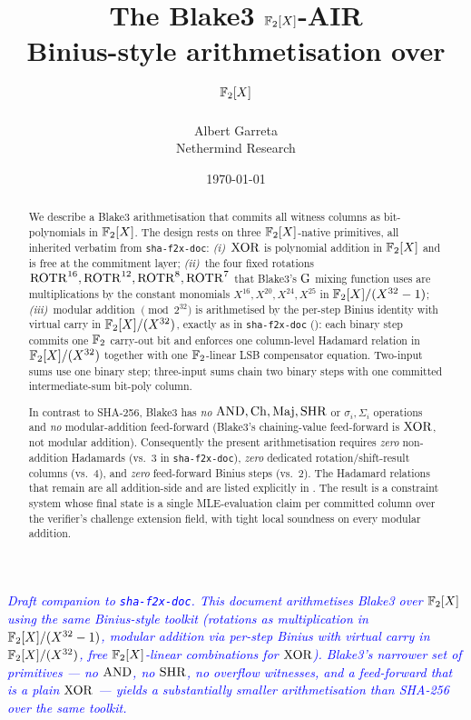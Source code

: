 \documentclass[11pt]{article}
\title{The Blake3 $\mathbb{F}_2[X]$-AIR \\
       \large Binius-style arithmetisation over $\mathbb{F}_2[X]$}
\author{Albert Garreta \\[2pt] \normalsize Nethermind Research}
\date{\today}
\begin{document}
\maketitle

\begin{center}
\textcolor{blue}{\textit{Draft companion to \texttt{sha-f2x-doc}. This
document arithmetises Blake3 over $\mathbb{F}_2[X]$ using the same Binius-style
toolkit (rotations as multiplication in $\mathbb{F}_2[X]/(X^{32}-1)$, modular addition via
per-step Binius with virtual carry in $\mathbb{F}_2[X]/(X^{32})$, free $\mathbb{F}_2[X]$-linear
combinations for $\operatorname{XOR}$). Blake3's narrower set of primitives — no
$\operatorname{AND}$, no $\operatorname{SHR}$, no overflow witnesses, and a feed-forward that is a
plain $\operatorname{XOR}$ — yields a substantially smaller arithmetisation than
SHA-256 over the same toolkit.}}
\end{center}
\vspace{0.5em}

\begin{abstract}
We describe a Blake3 arithmetisation that commits all witness columns
as bit-polynomials in $\mathbb{F}_2[X]$. The design rests on three
$\mathbb{F}_2[X]$-native primitives, all inherited verbatim from
\texttt{sha-f2x-doc}: \emph{(i)}~$\operatorname{XOR}$ is polynomial addition in
$\mathbb{F}_2[X]$ and is free at the commitment layer; \emph{(ii)}~the four
fixed rotations $\operatorname{ROTR}^{16}, \operatorname{ROTR}^{12}, \operatorname{ROTR}^{8}, \operatorname{ROTR}^{7}$ that
Blake3's $\operatorname{G}$ mixing function uses are multiplications by the
constant monomials $X^{16}, X^{20}, X^{24}, X^{25}$ in
$\mathbb{F}_2[X]/(X^{32}-1)$; \emph{(iii)}~modular addition $\pmod{2^{32}}$ is
arithmetised by the per-step Binius identity with virtual carry in
$\mathbb{F}_2[X]/(X^{32})$, exactly as in \texttt{sha-f2x-doc}
(): each binary step commits one $\mathbb{F}_2$ carry-out
bit and enforces one column-level Hadamard relation in $\mathbb{F}_2[X]/(X^{32})$
together with one $\mathbb{F}_2$-linear LSB compensator equation. Two-input
sums use one binary step; three-input sums chain two binary steps with
one committed intermediate-sum bit-poly column.

In contrast to SHA-256, Blake3 has \emph{no} $\operatorname{AND}, \operatorname{Ch}, \operatorname{Maj}, \operatorname{SHR}$ or
$\sigma_i, \Sigma_i$ operations and \emph{no} modular-addition
feed-forward (Blake3's chaining-value feed-forward is $\operatorname{XOR}$, not
modular addition). Consequently the present arithmetisation requires
\emph{zero} non-addition Hadamards (vs.\ $3$ in
\texttt{sha-f2x-doc}), \emph{zero} dedicated rotation/shift-result
columns (vs.\ $4$), and \emph{zero} feed-forward Binius steps (vs.\
$2$). The Hadamard relations that remain are all addition-side and
are listed explicitly in \Cref{sec:uair}. The result is a constraint
system whose final state is a single MLE-evaluation claim per
committed column over the verifier's challenge extension field, with
tight local soundness on every modular addition.
\end{abstract}

\tableofcontents





\end{document}
